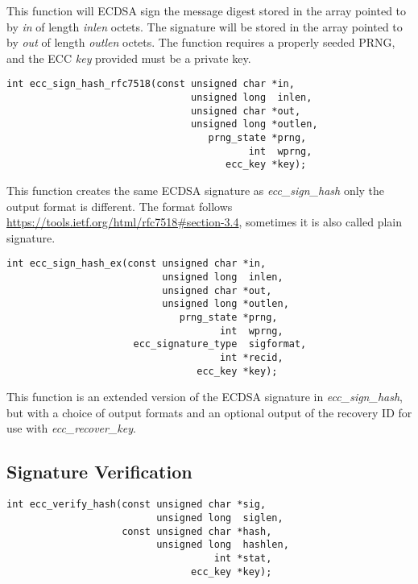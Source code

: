 \documentclass[synpaper]{book}
\begin{document}
This function will ECDSA sign the message digest stored in the array pointed to by \textit{in} of length \textit{inlen} octets.  The signature
will be stored in the array pointed to by \textit{out} of length \textit{outlen} octets.  The function requires a properly seeded PRNG, and
the ECC \textit{key} provided must be a private key.

\begin{verbatim}
int ecc_sign_hash_rfc7518(const unsigned char *in,
                                unsigned long  inlen,
                                unsigned char *out,
                                unsigned long *outlen,
                                   prng_state *prng,
                                          int  wprng,
                                      ecc_key *key);
\end{verbatim}

This function creates the same ECDSA signature as \textit{ecc\_sign\_hash} only the output format is different.
The format follows \url{https://tools.ietf.org/html/rfc7518#section-3.4}, sometimes it is also called plain signature.

\begin{verbatim}
int ecc_sign_hash_ex(const unsigned char *in,
                           unsigned long  inlen,
                           unsigned char *out,
                           unsigned long *outlen,
                              prng_state *prng,
                                     int  wprng,
                      ecc_signature_type  sigformat,
                                     int *recid,
                                 ecc_key *key);
\end{verbatim}

This function is an extended version of the ECDSA signature in \textit{ecc\_sign\_hash}, but with a choice of output formats
and an optional output of the recovery ID for use with \textit{ecc\_recover\_key}.

\subsection{Signature Verification}
\begin{verbatim}
int ecc_verify_hash(const unsigned char *sig,
                          unsigned long  siglen,
                    const unsigned char *hash,
                          unsigned long  hashlen,
                                    int *stat,
                                ecc_key *key);
\end{verbatim}
\end{document}

